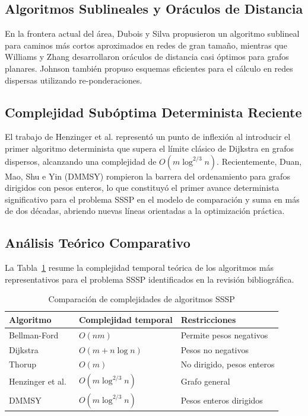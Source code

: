 \documentclass[conference]{IEEEtran}
\begin{document}
\subsection{Algoritmos Sublineales y Oráculos de Distancia}

En la frontera actual del área, Dubois y Silva \cite{anonimo2020} propusieron un algoritmo sublineal para caminos más cortos aproximados en redes de gran tamaño, mientras que Williams y Zhang \cite{anonimo2021} desarrollaron oráculos de distancia casi óptimos para grafos planares. Johnson \cite{johnson1977} también propuso esquemas eficientes para el cálculo en redes dispersas utilizando re-ponderaciones.

\subsection{Complejidad Subóptima Determinista Reciente}

El trabajo de Henzinger et al. \cite{henzinger2020} representó un punto de inflexión al introducir el primer algoritmo determinista que supera el límite clásico de Dijkstra en grafos dispersos, alcanzando una complejidad de $O(m \log^{2/3} n)$. Recientemente, Duan, Mao, Shu e Yin \cite{duan2025} (DMMSY) rompieron la barrera del ordenamiento para grafos dirigidos con pesos enteros, lo que constituyó el primer avance determinista significativo para el problema SSSP en el modelo de comparación y suma en más de dos décadas, abriendo nuevas líneas orientadas a la optimización práctica.

\subsection{Análisis Teórico Comparativo}

La Tabla~\ref{tab:complejidades} resume la complejidad temporal teórica de los algoritmos más representativos para el problema SSSP identificados en la revisión bibliográfica.

\begin{table}[H]
\caption{Comparación de complejidades de algoritmos SSSP}
\label{tab:complejidades}
\centering
\begin{tabular}{l >{\centering\arraybackslash}m{2.3cm} >{\raggedright\arraybackslash}p{2.0cm}}
\toprule
\textbf{Algoritmo} & \textbf{Complejidad temporal} & \textbf{Restricciones} \\
\midrule
Bellman-Ford \cite{bellman1958} & $O(nm)$ & Permite pesos negativos \\[2pt]
Dijkstra \cite{dijkstra1959} & $O(m + n \log n)$ & Pesos no negativos \\[2pt]
Thorup \cite{thorup1999} & $O(m)$ & No dirigido, pesos enteros \\[2pt]
Henzinger et al.\ \cite{henzinger2020} & $O(m \log^{2/3} n)$ & Grafo general \\[2pt]
DMMSY \cite{duan2025} & $O(m \log^{2/3} n)$ & Pesos enteros dirigidos \\
\bottomrule
\end{tabular}
\end{table}
\end{document}
